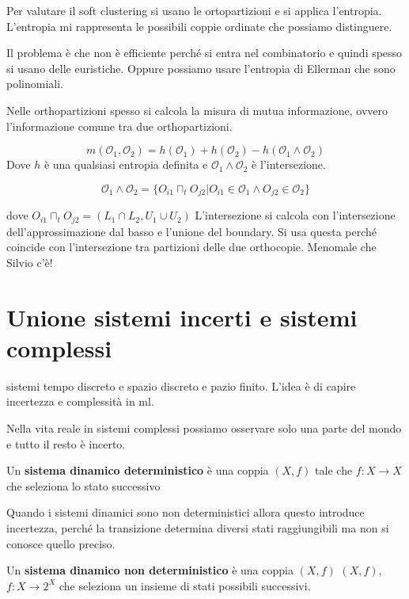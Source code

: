 Per valutare il soft clustering si usano le ortopartizioni e si applica l'entropia.
L'entropia mi rappresenta le possibili coppie ordinate che possiamo distinguere.

Il problema è che non è efficiente perché si entra nel combinatorio
e quindi spesso si usano delle euristiche. Oppure possiamo usare l'entropia di 
Ellerman che sono polinomiali.

Nelle orthopartizioni spesso si calcola la misura di mutua informazione, ovvero 
l'informazione comune tra due orthopartizioni. 

$$m(\mathcal{O}_1,\mathcal{O}_2) = h(\mathcal{O}_1) + h(\mathcal{O}_2) - h(\mathcal{O}_1\land \mathcal{O}_2) $$
Dove $h$ è una qualsiasi entropia definita e $\mathcal{O}_1\land \mathcal{O}_2$ è 
l'intersezione.

$$\mathcal{O}_1\land \mathcal{O}_2=\{O_{i1}\sqcap_t O_{j2}|O_{i1}\in \mathcal{O}_1 \land O_{j2}\in\mathcal{O}_2\}$$

dove $O_{i1}\sqcap_t O_{j2} = (L_1\cap L_2, U_1\cup U_2)$
L'intersezione si calcola con l'intersezione dell'approssimazione dal basso e l'unione del boundary. Si usa 
questa perché coincide con l'intersezione tra partizioni delle due orthocopie. Menomale che Silvio c'è!

\section{Unione sistemi incerti e sistemi complessi}
sistemi tempo discreto e spazio discreto e pazio finito. L'idea è di capire incertezza 
e complessità in ml.

Nella vita reale in sistemi complessi possiamo osservare solo una parte del mondo 
e tutto il resto è incerto.

\begin{definizione}
    Un \textbf{sistema dinamico deterministico} è una coppia $(X,f)$ tale che 
    $f:X\to X$  che seleziona lo stato successivo
\end{definizione}

Quando i sistemi dinamici sono non deterministici allora questo introduce incertezza,
perché la transizione determina diversi stati raggiungibili ma non si conosce
quello preciso.

\begin{definizione}
    Un \textbf{sistema dinamico non deterministico} è una coppia $(X,f)$
    $(X,f)$, $f:X\to 2^X$  che seleziona un insieme di stati possibili successivi.
\end{definizione}

